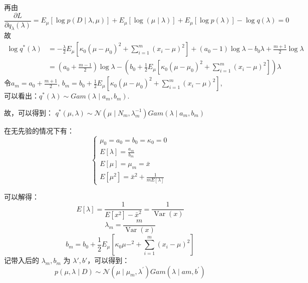 \documentclass[UTF8,a4paper,AutoFakeBold,AutoFakeSlant]{article}
\begin{document}
再由
$$ \frac{\partial L}{\partial q_{\lambda}(\lambda)}=E_{\mu}[\log p(D \mid \lambda, \mu)]+E_{\mu}[\log (\mu \mid \lambda)]+E_{\mu}[\log p(\lambda)]-\log q(\lambda)=0 $$
故
\begin{equation*}
  \begin{aligned}
    \log q^{*}(\lambda) & =-\frac{\lambda}{2} E_{\mu}\left[\kappa_{0}\left(\mu-\mu_{0}\right)^{2}+\sum_{i=1}^{m}\left(x_{i}-\mu\right)^{2}\right]+\left(a_{0}-1\right) \log \lambda-b_{0} \lambda+\frac{m+1}{2} \log \lambda \\
                        & =\left(a_{0}+\frac{m-1}{2}\right) \log \lambda-\left(b_{0}+\frac{1}{2} E_{\mu}\left[\kappa_{0}\left(\mu-\mu_{0}\right)^{2}+\sum_{i=1}^{m}\left(x_{i}-\mu\right)^{2}\right]\right) \lambda
  \end{aligned}
\end{equation*}
令$ a_{m}=a_{0}+\frac{m+1}{2} $, $ b_{m}=b_{0}+\frac{1}{2} E_{\mu}\left[\kappa_{0}\left(\mu-\mu_{0}\right)^{2}+\sum_{i=1}^{m}\left(x_{i}-\mu\right)^{2}\right] $,
\\可以看出：$ q^*(\lambda) \sim Gam(\lambda \mid a_m, b_m) $.

故，可以得到：
$ q^{*}(\mu, \lambda) \sim \mathcal{N} \left(\mu \mid N_{m}, \lambda_{m}^{-1}\right) Gam\left(\lambda \mid a_{m}, b_{m}\right)$

在无先验的情况下有：
\begin{equation*}
  \left\{
  \begin{array}{l}
    \mu_0 = a_0 = b_0 = \kappa_0 = 0 \\
    E[\lambda] = \frac{a_m}{b_m}     \\
    E[\mu] = \mu_m = \bar{x}         \\
    E[\mu^2] = \bar{x}^2+\frac{1}{m E[\lambda]}
  \end{array}
  \right.
\end{equation*}

可以解得：
$$ E[\lambda] = \frac{1}{E[x^2]-\bar{x}^2} = \frac{1}{\operatorname{Var}(x)} $$
$$ \lambda_m = \frac{m}{\operatorname{Var}(x)} $$
$$ b_m = b_{0}+\frac{1}{2} E_{\mu}\left[\kappa_{0}\mu-^{2}+\sum_{i=1}^{m}\left(x_{i}-\mu\right)^{2}\right] $$
记带入后的 $\lambda_m, b_m$ 为 $\lambda', b'$，可以得到：
$$ p(\mu, \lambda \mid D) \sim \mathcal{N} \left(\mu \mid \mu_{m}, \lambda^{\prime}\right) Gam\left(\lambda \mid a m, b^{\prime}\right) $$


\subsection{}
\end{document}
